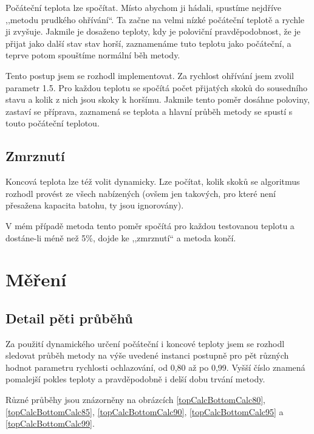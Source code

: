 \documentclass[12pt,a4paper]{article}
\begin{document}
Počáteční teplota lze spočítat. Místo abychom ji hádali, spustíme nejdříve ,,metodu prudkého ohřívání``. Ta začne na velmi nízké počáteční teplotě a rychle ji zvyšuje. Jakmile je dosaženo teploty, kdy je poloviční pravděpodobnost, že je přijat jako další stav stav horší, zaznamenáme tuto teplotu jako počáteční, a teprve potom spouštíme normální běh metody.

Tento postup jsem se rozhodl implementovat. Za rychlost ohřívání jsem zvolil parametr 1.5. Pro každou teplotu se spočítá počet přijatých skoků do sousedního stavu a kolik z nich jsou skoky k horšímu. Jakmile tento poměr dosáhne poloviny, zastaví se příprava, zaznamená se teplota a hlavní průběh metody se spustí s touto počáteční teplotou.

\subsection{Zmrznutí}
\label{freeze}

Koncová teplota lze též volit dynamicky. Lze počítat, kolik skoků se algoritmus rozhodl provést ze všech nabízených (ovšem jen takových, pro které není přesažena kapacita batohu, ty jsou ignorovány).

V mém případě metoda tento poměr spočítá pro každou testovanou teplotu a dostáne-li méně než 5\%, dojde ke ,,zmrznutí`` a metoda končí.


\section{Měření}

\subsection{Detail pěti průběhů}

Za použití dynamického určení počáteční i koncové teploty jsem se rozhodl sledovat průběh metody na výše uvedené instanci postupně pro pět různých hodnot parametru rychlosti ochlazování, od 0,80 až po 0,99. Vyšší číslo znamená pomalejší pokles teploty a pravděpodobně i delší dobu trvání metody.

Různé průběhy jsou znázorněny na obrázcích \ref{topCalcBottomCalc80}, \ref{topCalcBottomCalc85}, \ref{topCalcBottomCalc90}, \ref{topCalcBottomCalc95} a \ref{topCalcBottomCalc99}.
\end{document}
